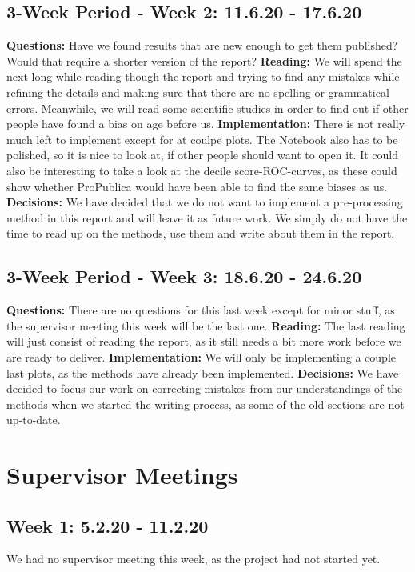 \documentclass[11pt, fleqn]{article}
\begin{document}
\subsection*{3-Week Period - Week 2: 11.6.20 - 17.6.20}
\textbf{Questions:} Have we found results that are new enough to get them published? Would that require a shorter version of the report?
\textbf{Reading:} We will spend the next long while reading though the report and trying to find any mistakes while refining the details and making sure that there are no spelling or grammatical errors. Meanwhile, we will read some scientific studies in order to find out if other people have found a bias on age before us.
\textbf{Implementation:} There is not really much left to implement except for at coulpe plots. The Notebook also has to be polished, so it is nice to look at, if other people should want to open it. It could also be interesting to take a look at the decile score-ROC-curves, as these could show whether ProPublica would have been able to find the same biases as us.
\textbf{Decisions:} We have decided that we do not want to implement a pre-processing method in this report and will leave it as future work. We simply do not have the time to read up on the methods, use them and write about them in the report.

\subsection*{3-Week Period - Week 3: 18.6.20 - 24.6.20}
\textbf{Questions:} There are no questions for this last week except for minor stuff, as the supervisor meeting this week will be the last one.
\textbf{Reading:} The last reading will just consist of reading the report, as it still needs a bit more work before we are ready to deliver.
\textbf{Implementation:} We will only be implementing a couple last plots, as the methods have already been implemented.
\textbf{Decisions:} We have decided to focus our work on correcting mistakes from our understandings of the methods when we started the writing process, as some of the old sections are not up-to-date.


\section*{Supervisor Meetings}

\subsection*{Week 1: 5.2.20 - 11.2.20}
We had no supervisor meeting this week, as the project had not started yet.
\end{document}
